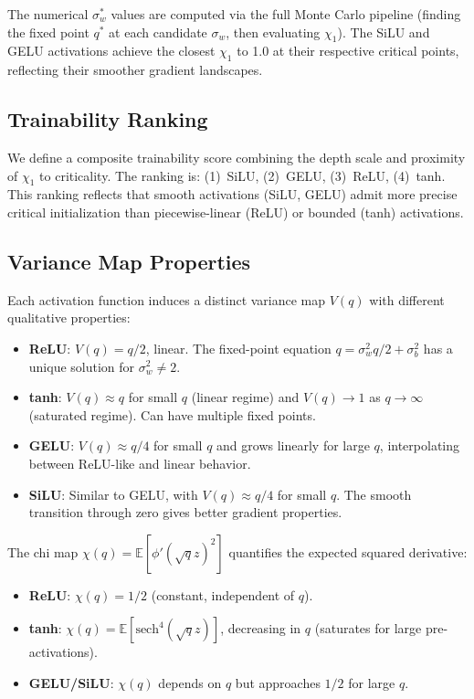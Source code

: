 \documentclass[10pt]{article}
\theoremstyle{definition}
\begin{document}
The numerical $\sigma_w^*$ values are computed via the full Monte Carlo pipeline (finding the fixed point $q^*$ at each candidate $\sigma_w$, then evaluating $\chi_1$).
The SiLU and GELU activations achieve the closest $\chi_1$ to 1.0 at their respective critical points, reflecting their smoother gradient landscapes.

\subsection{Trainability Ranking}

We define a composite trainability score combining the depth scale and proximity of $\chi_1$ to criticality.
The ranking is: (1)~SiLU, (2)~GELU, (3)~ReLU, (4)~tanh.
This ranking reflects that smooth activations (SiLU, GELU) admit more precise critical initialization than piecewise-linear (ReLU) or bounded (tanh) activations.

\subsection{Variance Map Properties}

Each activation function induces a distinct variance map $V(q)$ with different qualitative properties:
\begin{itemize}[nosep]
  \item \textbf{ReLU}: $V(q) = q/2$, linear. The fixed-point equation $q = \sigma_w^2 q/2 + \sigma_b^2$ has a unique solution for $\sigma_w^2 \neq 2$.
  \item \textbf{tanh}: $V(q) \approx q$ for small $q$ (linear regime) and $V(q) \to 1$ as $q \to \infty$ (saturated regime). Can have multiple fixed points.
  \item \textbf{GELU}: $V(q) \approx q/4$ for small $q$ and grows linearly for large $q$, interpolating between ReLU-like and linear behavior.
  \item \textbf{SiLU}: Similar to GELU, with $V(q) \approx q/4$ for small $q$. The smooth transition through zero gives better gradient properties.
\end{itemize}

The chi map $\chi(q) = \mathbb{E}[\phi'(\sqrt{q} z)^2]$ quantifies the expected squared derivative:
\begin{itemize}[nosep]
  \item \textbf{ReLU}: $\chi(q) = 1/2$ (constant, independent of $q$).
  \item \textbf{tanh}: $\chi(q) = \mathbb{E}[\text{sech}^4(\sqrt{q}z)]$, decreasing in $q$ (saturates for large pre-activations).
  \item \textbf{GELU/SiLU}: $\chi(q)$ depends on $q$ but approaches $1/2$ for large $q$.
\end{itemize}
\end{document}
